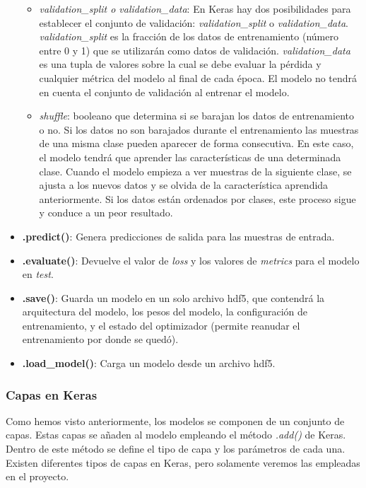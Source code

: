 \begin{itemize}
\begin{itemize}
            \item \textit{validation\_split o validation\_data}: En Keras hay dos posibilidades para establecer el conjunto de validación: \textit{validation\_split} o \textit{validation\_data}. \textit{validation\_split} es la fracción de los datos de entrenamiento (número entre 0 y 1) que se utilizarán como datos de validación. \textit{validation\_data} es una tupla de valores sobre la cual se debe evaluar la pérdida y cualquier métrica del modelo al final de cada época. El modelo no tendrá en cuenta el conjunto de validación al entrenar el modelo.
            
            \item \textit{shuffle}: booleano que determina si se barajan los datos de entrenamiento o no. Si los datos no son barajados durante el entrenamiento las muestras de una misma clase pueden aparecer de forma consecutiva. En este caso, el modelo tendrá que aprender las características de una determinada clase. Cuando el modelo empieza a ver muestras de la siguiente clase, se ajusta a los nuevos datos y se olvida de la característica aprendida anteriormente. Si los datos están ordenados por clases, este proceso sigue y conduce a un peor resultado.
        \end{itemize}
    
    \item \textbf{.predict()}: Genera predicciones de salida para las muestras de entrada. 
    
    \item \textbf{.evaluate()}: Devuelve el valor de \textit{loss} y los valores de \textit{metrics} para el modelo en \textit{test}.
    
    \item \textbf{.save()}: Guarda un modelo en un solo archivo \acrfull{hdf5}, que contendrá la arquitectura del modelo, los pesos del modelo, la configuración de entrenamiento, y el estado del optimizador (permite reanudar el entrenamiento por donde se quedó).
    
    \item \textbf{.load\_model()}: Carga un modelo desde un archivo \acrshort{hdf5}.
\end{itemize}


\subsubsection{Capas en Keras}

Como hemos visto anteriormente, los modelos se componen de un conjunto de capas. Estas capas se añaden al modelo empleando el método \textit{.add()} de Keras. Dentro de este método se define el tipo de capa y los parámetros de cada una. Existen diferentes tipos de capas en Keras, pero solamente veremos las empleadas en el proyecto.

